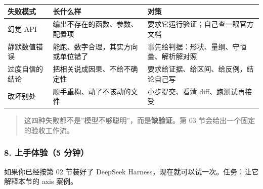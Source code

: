 {\def\LTcaptype{none} %
\begin{longtable}[]{@{}
  >{\raggedright\arraybackslash}p{}
  >{\raggedright\arraybackslash}p{}
  >{\raggedright\arraybackslash}p{}@{}}
\toprule\noalign{}
\begin{minipage}[b]{\linewidth}\raggedright
失败模式
\end{minipage} & \begin{minipage}[b]{\linewidth}\raggedright
长什么样
\end{minipage} & \begin{minipage}[b]{\linewidth}\raggedright
对策
\end{minipage} \\
\midrule\noalign{}
\endhead
\bottomrule\noalign{}
\endlastfoot
幻觉 API & 编出不存在的函数、参数、配置项 &
要求它运行验证；自己查一眼官方文档 \\
静默数值错误 & 能跑、数字合理，其实方向或单位错了 &
事先给判据：形状、量纲、守恒量、解析解对照 \\
过度自信的结论 & 把相关说成因果、不给不确定性 &
要求给证据、给区间、给反例，结论自己写 \\
改坏别处 & 顺手重构、动了不该动的文件 & 小步提交、看清
diff、跑测试再接受 \\
\end{longtable}
}

\begin{quote}
这四种失败都不是''模型不够聪明''，而是\textbf{缺验证}。第 03
节会给出一个固定的验收工作流。
\end{quote}

\subsubsection{8. 上手体验（5
分钟）}\label{ux4e0aux624bux4f53ux9a8c5-ux5206ux949f}

如果你已经按第 02 节装好了 DeepSeek
Harness，现在就可以试一次。任务：让它解释本节的 axis 案例。

\begin{Shaded}
\begin{Highlighting}[]


\end{Highlighting}
\end{Shaded}

